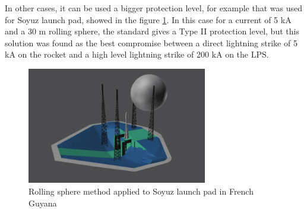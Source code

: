 In other cases, it can be used a bigger protection level, for example that was used
for Soyuz launch pad, showed in the figure \ref{fig:soyuz_sphere}. In this case
for a current of 5 kA and a 30 m rolling sphere, the standard gives
a Type II protection level, but this solution was found as the best
compromise between a direct lightning strike of 5 kA on the rocket
and a high level lightning strike of 200 kA on the LPS.

\begin{figure}[h!]
	\centering
	\includegraphics[width=0.7\textwidth]{img/soyuz_sphere.png}
	\caption{Rolling sphere method applied to Soyuz launch pad in French Guyana}
	\label{fig:soyuz_sphere}
\end{figure}
